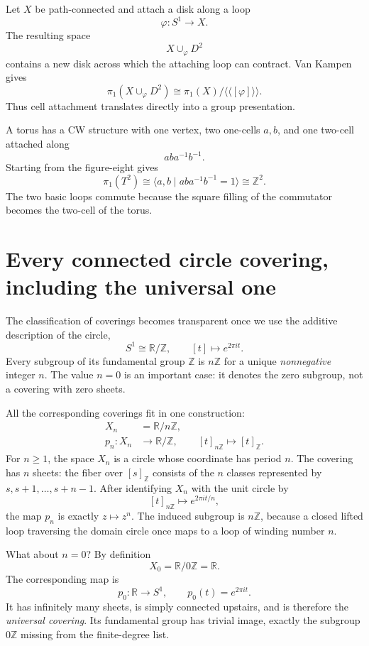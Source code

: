 Let \(X\) be path-connected and attach a disk along a loop
\[
  \varphi:S^1\to X.
\]
The resulting space
\[
  X\cup_\varphi D^2
\]
contains a new disk across which the attaching loop can contract.  Van Kampen gives
\[
  \pi_1(X\cup_\varphi D^2)
  \cong
  \pi_1(X)/\langle\!\langle[\varphi]\rangle\!\rangle.
\]
Thus cell attachment translates directly into a group presentation.

A torus has a CW structure with one vertex, two one-cells \(a,b\), and one two-cell attached along
\[
  aba^{-1}b^{-1}.
\]
Starting from the figure-eight gives
\[
  \pi_1(T^2)
  \cong
  \langle a,b\mid aba^{-1}b^{-1}=1\rangle
  \cong\mathbb Z^2.
\]
The two basic loops commute because the square filling of the commutator becomes the two-cell of the torus.

\section{Every connected circle covering, including the universal one}

The classification of coverings becomes transparent once we use the additive description of the circle,
\[
 S^1\cong\mathbb R/\mathbb Z,\qquad
 [t]\longmapsto e^{2\pi it}.
\]
Every subgroup of its fundamental group $\mathbb Z$ is $n\mathbb Z$ for a unique \emph{nonnegative} integer $n$. The value $n=0$ is an important case: it denotes the zero subgroup, not a covering with zero sheets.

All the corresponding coverings fit in one construction:
\[
 \boxed{\begin{aligned}
 X_n&=\mathbb R/n\mathbb Z,\\[-2pt]
 p_n:X_n&\longrightarrow\mathbb R/\mathbb Z,\qquad
           [t]_{n\mathbb Z}\longmapsto[t]_{\mathbb Z}.
 \end{aligned}}
\]
For $n\ge1$, the space $X_n$ is a circle whose coordinate has period $n$. The covering has $n$ sheets: the fiber over $[s]_{\mathbb Z}$ consists of the $n$ classes represented by
$s,s+1,\ldots,s+n-1$. After identifying $X_n$ with the unit circle by
\[
 [t]_{n\mathbb Z}\longmapsto e^{2\pi it/n},
\]
the map $p_n$ is exactly $z\mapsto z^n$. The induced subgroup is $n\mathbb Z$, because a closed lifted loop traversing the domain circle once maps to a loop of winding number $n$.

What about $n=0$? By definition
\[
 X_0=\mathbb R/0\mathbb Z=\mathbb R.
\]
The corresponding map is
\[
 p_0:\mathbb R\longrightarrow S^1,\qquad
 p_0(t)=e^{2\pi it}.
\]
It has infinitely many sheets, is simply connected upstairs, and is therefore the \emph{universal covering}. Its fundamental group has trivial image, exactly the subgroup $0\mathbb Z$ missing from the finite-degree list.


